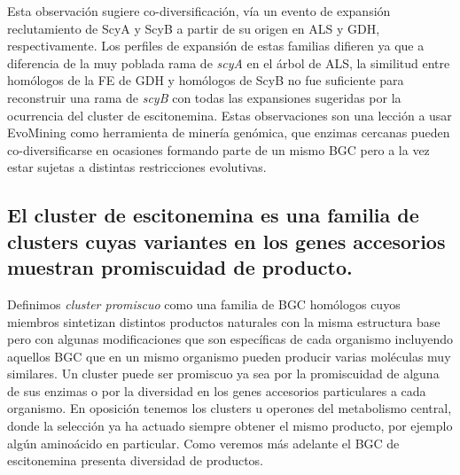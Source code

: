 \documentclass[12pt,twoside]{reedthesis}
\begin{document}
  Esta observación sugiere co-diversificación, vía un evento de expansión
  reclutamiento de ScyA y ScyB a partir de su origen en ALS y GDH,
  respectivamente. Los perfiles de expansión de estas familias difieren ya
  que a diferencia de la muy poblada rama de \emph{scyA} en el árbol de
  ALS, la similitud entre homólogos de la FE de GDH y homólogos de ScyB no
  fue suficiente para reconstruir una rama de \emph{scyB} con todas las
  expansiones sugeridas por la ocurrencia del cluster de escitonemina.
  Estas observaciones son una lección a usar EvoMining como herramienta de
  minería genómica, que enzimas cercanas pueden co-diversificarse en
  ocasiones formando parte de un mismo BGC pero a la vez estar sujetas a
  distintas restricciones evolutivas.
  
  \subsection{El cluster de escitonemina es una familia de clusters cuyas
  variantes en los genes accesorios muestran promiscuidad de
  producto.}\label{el-cluster-de-escitonemina-es-una-familia-de-clusters-cuyas-variantes-en-los-genes-accesorios-muestran-promiscuidad-de-producto.}
  
  Definimos \emph{cluster promiscuo} como una familia de BGC homólogos
  cuyos miembros sintetizan distintos productos naturales con la misma
  estructura base pero con algunas modificaciones que son específicas de
  cada organismo incluyendo aquellos BGC que en un mismo organismo pueden
  producir varias moléculas muy similares. Un cluster puede ser promiscuo
  ya sea por la promiscuidad de alguna de sus enzimas o por la diversidad
  en los genes accesorios particulares a cada organismo. En oposición
  tenemos los clusters u operones del metabolismo central, donde la
  selección ya ha actuado siempre obtener el mismo producto, por ejemplo
  algún aminoácido en particular. Como veremos más adelante el BGC de
  escitonemina presenta diversidad de productos.
  
\end{document}
